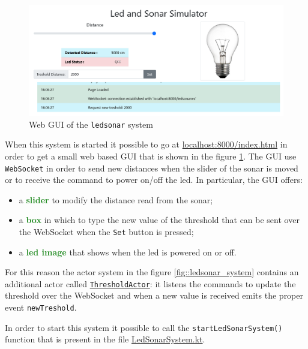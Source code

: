 \begin{figure}[h]
	\centering
	\includegraphics[width=\textwidth]{img/[EG]led_sonar_actor_gui}
	\caption{Web GUI of the \texttt{ledsonar} system}
	\label{fig::ledsonar_system_gui}
\end{figure}

When this system is started it possible to go at \href{http://localhost:8000/index.html}{localhost:8000/index.html} in order to get a small web based GUI that is shown in the figure \ref{fig::ledsonar_system_gui}.
The GUI use \texttt{WebSocket} in order to send new distances when the slider of the sonar is moved or to receive the command to power on/off the led. In particular, the GUI offers:

\begin{itemize}
	\item a \textcolor{ForestGreen}{\textbf{slider}} to modify the distance read from the sonar;
	
	\item a \textcolor{ForestGreen}{\textbf{box}} in which to type the new value of the threshold that can be sent over the WebSocket when the \texttt{Set} button is pressed;
	
	\item a \textcolor{ForestGreen}{\textbf{led image}} that shows when the led is powered on or off.
\end{itemize}

For this reason the actor system in the figure \ref{fig::ledsonar_system} contains an additional actor called \underline{\texttt{ThresholdActor}}: it listens the commands to update the threshold over the WebSocket and when a new value is received emits the proper event \texttt{newTreshold}.

In order to start this system it possible to call the \texttt{startLedSonarSystem()} function that is present in the file \href{https://github.com/LM-96/QA-Extensions/blob/main/it.unibo.ledsonarsystem/src/main/kotlin/it/unibo/ledsonarsystem/LedSonarSystem.kt}{LedSonarSystem.kt}.


